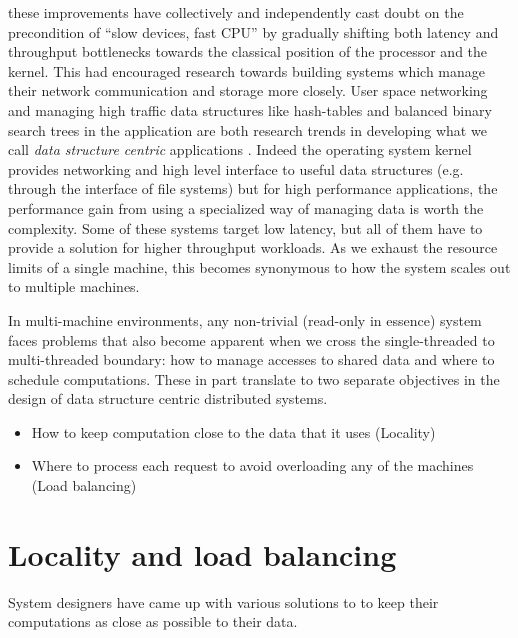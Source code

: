 these improvements have collectively and independently cast doubt on the precondition of
``slow devices, fast CPU'' by gradually shifting both latency and throughput
bottlenecks towards the classical position of the processor and the kernel.
This had encouraged research towards building systems which manage their
network communication and storage more closely. User space networking  and managing high
traffic data structures like hash-tables and balanced binary search trees
 in the application are
both research trends in developing what we call \emph{data structure centric}
applications . Indeed the operating system kernel provides networking and high
level interface to useful data structures (e.g. through the interface of file
systems) but for high performance applications, the performance gain from using
a specialized way of managing data is worth the complexity.
Some of these systems target low latency, but all of them have to provide
a solution for higher throughput workloads. As we exhaust the resource limits
of a single machine, this becomes synonymous to how the system scales out to
multiple machines.

In multi-machine environments, any non-trivial (read-only in essence) system
faces problems that also become apparent when we cross the single-threaded
to multi-threaded boundary: how to manage accesses to shared data and where to
schedule computations. These in part translate to two separate objectives in
the design of data structure centric distributed systems.  
\begin{itemize}
    \item How to keep computation close to the data that it uses (Locality)
    \item Where to process each request to avoid overloading any of the machines (Load balancing)
\end{itemize}





\section{Locality and load balancing}
System designers have came up with various solutions to to keep their
computations as close as possible to their data.


